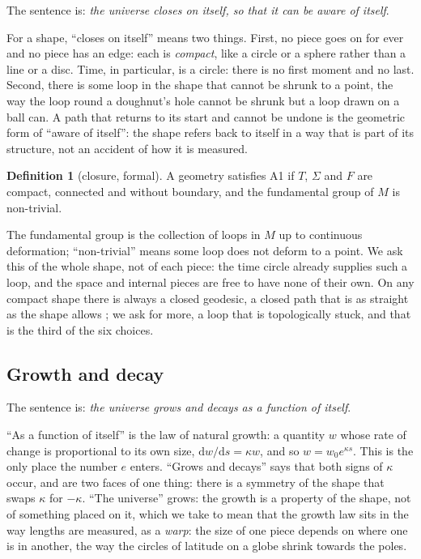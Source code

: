 \documentclass[11pt,a4paper]{article}
\theoremstyle{plain}
\theoremstyle{definition}
\newtheorem{definition}[theorem]{Definition}
\theoremstyle{remark}
\begin{document}
The sentence is: \emph{the universe closes on itself, so that it can be aware of itself}.

For a shape, ``closes on itself'' means two things. First, no piece goes on for ever and no piece has an edge: each is \emph{compact}, like a circle or a sphere rather than a line or a disc. Time, in particular, is a circle: there is no first moment and no last. Second, there is some loop in the shape that cannot be shrunk to a point, the way the loop round a doughnut's hole cannot be shrunk but a loop drawn on a ball can. A path that returns to its start and cannot be undone is the geometric form of ``aware of itself'': the shape refers back to itself in a way that is part of its structure, not an accident of how it is measured.

\begin{definition}[closure, formal]\label{def:A1}
A geometry satisfies A1 if $T$, $\Sigma$ and $F$ are compact, connected and without boundary, and the fundamental group of $M$ is non-trivial.
\end{definition}

The fundamental group is the collection of loops in $M$ up to continuous deformation; ``non-trivial'' means some loop does not deform to a point. We ask this of the whole shape, not of each piece: the time circle already supplies such a loop, and the space and internal pieces are free to have none of their own. On any compact shape there is always a closed geodesic, a closed path that is as straight as the shape allows \cite{LyusternikFet}; we ask for more, a loop that is topologically stuck, and that is the third of the six choices.

\subsection{Growth and decay}\label{sec:A2}

The sentence is: \emph{the universe grows and decays as a function of itself}.

``As a function of itself'' is the law of natural growth: a quantity $w$ whose rate of change is proportional to its own size, $\mathrm{d}w/\mathrm{d}s=\kappa w$, and so $w=w_{0}e^{\kappa s}$. This is the only place the number $e$ enters. ``Grows and decays'' says that both signs of $\kappa$ occur, and are two faces of one thing: there is a symmetry of the shape that swaps $\kappa$ for $-\kappa$. ``The universe'' grows: the growth is a property of the shape, not of something placed on it, which we take to mean that the growth law sits in the way lengths are measured, as a \emph{warp}: the size of one piece depends on where one is in another, the way the circles of latitude on a globe shrink towards the poles.
\end{document}
